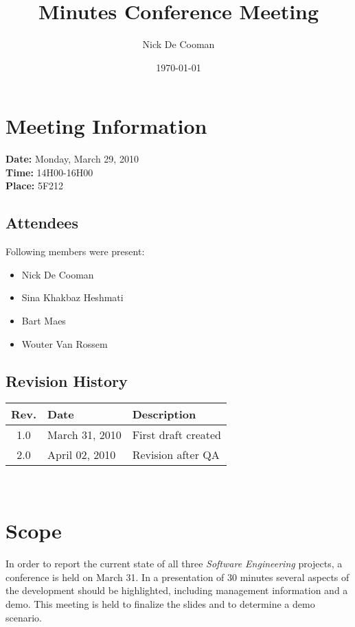 \documentclass[a4paper, 12pt]{article}
\begin{document}
\title{Minutes Conference Meeting}
\author{Nick De Cooman}
\date{\today}

\maketitle	
	\section{Meeting Information}
		\textbf{Date:} Monday, March 29, 2010\\
		\textbf{Time:} 14H00-16H00\\
		\textbf{Place:} 5F212
		
		\subsection{Attendees}
Following members were present:
			\begin{itemize}
				\item Nick De Cooman
				\item Sina Khakbaz Heshmati
				\item Bart Maes
				\item Wouter Van Rossem
			\end{itemize}
			
		\subsection{Revision History}
			\begin{tabular}{c | l | l }
				\textbf{Rev.} & \textbf{Date} & \textbf{Description} \\
				\hline
				1.0 & March 31, 2010 & First draft created \\
				2.0 & April 02, 2010 & Revision after QA \\

			\end{tabular}
			\\		

\section{Scope}

In order to report the current state of all three \emph{Software Engineering} projects, a conference is held on March 31. In a presentation of 30 minutes several aspects of the development should be highlighted, including management information and a demo. This meeting is held to finalize the slides and to determine a demo scenario. 
\end{document}
